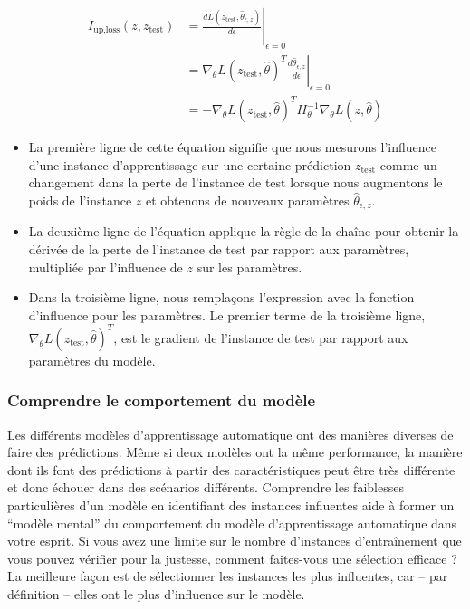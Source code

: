 \begin{align*}
I_{\text{up,loss}}(z,z_{\text{test}}) &= \left. \frac{d L(z_{\text{test}}, \hat{\theta}_{\epsilon, z})}{d\epsilon} \right|_{\epsilon=0} \\
&= \left. \nabla_{\theta}L(z_{\text{test}}, \hat{\theta})^T \frac{d\hat{\theta}_{\epsilon, z}}{d\epsilon} \right|_{\epsilon=0} \\
&= -\nabla_{\theta}L(z_{\text{test}}, \hat{\theta})^T H^{-1}_{\theta} \nabla_{\theta}L(z, \hat{\theta})
\end{align*}

\begin{itemize}
    \item La première ligne de cette équation signifie que nous mesurons l'influence d'une instance d'apprentissage sur une certaine prédiction $z_{\text{test}}$ comme un changement dans la perte de l'instance de test lorsque nous augmentons le poids de l'instance $z$ et obtenons de nouveaux paramètres $\hat{\theta}_{\epsilon, z}$.
    \item La deuxième ligne de l'équation applique la règle de la chaîne pour obtenir la dérivée de la perte de l'instance de test par rapport aux paramètres, multipliée par l'influence de $z$ sur les paramètres.
    \item Dans la troisième ligne, nous remplaçons l'expression avec la fonction d'influence pour les paramètres. Le premier terme de la troisième ligne, $\nabla_{\theta}L(z_{\text{test}}, \hat{\theta})^T$, est le gradient de l'instance de test par rapport aux paramètres du modèle.
\end{itemize}


\subsubsection{Comprendre le comportement du modèle}

Les différents modèles d'apprentissage automatique ont des manières diverses de faire des prédictions. Même si deux modèles ont la même performance, la manière dont ils font des prédictions à partir des caractéristiques peut être très différente et donc échouer dans des scénarios différents. Comprendre les faiblesses particulières d'un modèle en identifiant des instances influentes aide à former un ``modèle mental'' du comportement du modèle d'apprentissage automatique dans votre esprit. Si vous avez une limite sur le nombre d'instances d'entraînement que vous pouvez vérifier pour la justesse, comment faites-vous une sélection efficace ? La meilleure façon est de sélectionner les instances les plus influentes, car – par définition – elles ont le plus d'influence sur le modèle.


